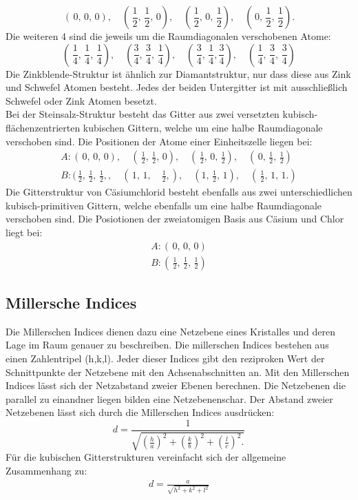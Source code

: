$$(\,0,\,0,\,0), \quad (\,\frac{1}{2},\, \frac{1}{2} ,\, 0), \quad (\, \frac{1}{2}, \,0 ,\, \frac{1}{2}),
\quad (\,0, \, \frac{1}{2} , \, \frac{1}{2}).$$
Die weiteren 4 sind die jeweils um die Raumdiagonalen verschobenen Atome:
$$ (\, \frac{1}{4},\, \frac{1}{4}, \, \frac{1}{4}), \quad (\frac{3}{4}, \, \frac{3}{4}, \, \frac{1}{4}),
\quad (\, \frac{3}{4}, \, \frac{1}{4}, \frac{3}{4}), \quad (\,\frac{1}{4},\,  \frac{3}{4}, \, \frac{3}{4}) $$
Die Zinkblende-Struktur ist ähnlich zur Diamantstruktur, nur dass diese aus
Zink und Schwefel Atomen besteht. Jedes der beiden Untergitter
ist mit ausschließlich Schwefel oder Zink Atomen besetzt.\\
Bei der Steinsalz-Struktur besteht das Gitter aus zwei versetzten kubisch-flächenzentrierten
kubischen Gittern, welche um eine halbe Raumdiagonale verschoben sind. Die
Positionen der Atome einer Einheitszelle liegen bei:
\begin{align}
    A:(\,0,\,0,\,0), \quad (\,\frac{1}{2},\, \frac{1}{2} ,\, 0), \quad (\, \frac{1}{2}, \,0 ,\, \frac{1}{2}),
    \quad (\,0, \, \frac{1}{2} , \, \frac{1}{2}) \\
    B:(\,\frac{1}{2},\,\frac{1}{2},\,\frac{1}{2},, \quad (\,1 , \, 1 , \quad\frac{1}{2},)
    ,\quad (1, \,\frac{1}{2}, \,1),\quad (\,\frac{1}{2}, \, 1, \,1.)
\end{align}
Die Gitterstruktur von Cäsiumchlorid besteht ebenfalls aus zwei unterschiedlichen
kubisch-primitiven Gittern, welche ebenfalls um eine halbe Raumdiagonale
verschoben sind. Die Posiotionen der zweiatomigen Basis aus Cäsium und Chlor liegt bei:
\begin{align}
A:(\,0 , \, 0 , \, 0)\\
B:(\, \frac{1}{2},\, \frac{1}{2},\, \frac{1}{2})
\end{align}
\subsection{Millersche Indices}

Die Millerschen Indices dienen dazu eine Netzebene eines Kristalles und deren
Lage im Raum genauer zu beschreiben. Die millerschen Indices bestehen aus einen Zahlentripel
(h,k,l). Jeder dieser Indices gibt den reziproken Wert der Schnittpunkte der
Netzebene mit den Achsenabschnitten an. Mit den Millerschen Indices lässt sich der
Netzabstand zweier Ebenen berechnen. Die Netzebenen die parallel zu einandner
liegen bilden eine Netzebenenschar. Der Abstand zweier Netzebenen lässt sich
durch die Millerschen Indices ausdrücken:
$$ d=\frac{1}{\sqrt{
\left(\frac{h}{a} \right)^2 + \left(\frac{k}{b} \right)^2 + \left(\frac{l}{c} \right)^2.
}}
$$
Für die kubischen Gitterstrukturen vereinfacht sich der allgemeine Zusammenhang zu:
\begin{align}
d=\frac{a}{\sqrt{h^2 + k^2 + l^2}}
\label{gitti}
\end{align}
